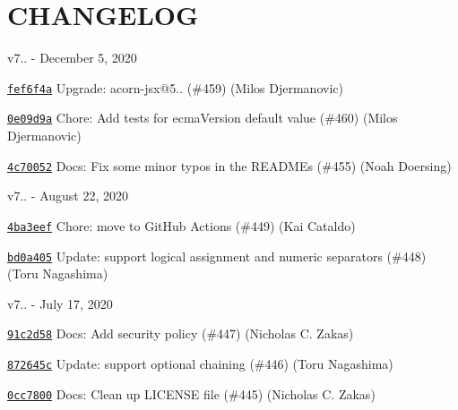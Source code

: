 \chapter{CHANGELOG}
\hypertarget{md__c_1_2_users_2_s_t_r_i_d_e_r_2source_2repos_2_internal_a_p_i_2_internal_a_p_i_2wwwroot_2lib_28a021f10c375091f8540f22b93ae7483}{}\label{md__c_1_2_users_2_s_t_r_i_d_e_r_2source_2repos_2_internal_a_p_i_2_internal_a_p_i_2wwwroot_2lib_28a021f10c375091f8540f22b93ae7483}
v7.. -\/ December 5, 2020


\begin{DoxyItemize}
\item \href{https://github.com/eslint/espree/commit/fef6f4a2803d959304c6961527044bd9da39ac92}{\texttt{ {\ttfamily fef6f4a}}} Upgrade\+: acorn-\/jsx@5.. (\#459) (Milos Djermanovic)
\item \href{https://github.com/eslint/espree/commit/0e09d9a4f213cb87073a6a87cb7d6317b77d1a23}{\texttt{ {\ttfamily 0e09d9a}}} Chore\+: Add tests for ecma\+Version default value (\#460) (Milos Djermanovic)
\item \href{https://github.com/eslint/espree/commit/4c70052df0b0ba903602c1f838918cbc07ee5eca}{\texttt{ {\ttfamily 4c70052}}} Docs\+: Fix some minor typos in the READMEs (\#455) (Noah Doersing)
\end{DoxyItemize}

v7.. -\/ August 22, 2020


\begin{DoxyItemize}
\item \href{https://github.com/eslint/espree/commit/4ba3eefdc4b32784565822b34f11977e99ca1a19}{\texttt{ {\ttfamily 4ba3eef}}} Chore\+: move to Git\+Hub Actions (\#449) (Kai Cataldo)
\item \href{https://github.com/eslint/espree/commit/bd0a405ffbe4962bcf5aa225ed3861a6a15cb827}{\texttt{ {\ttfamily bd0a405}}} Update\+: support logical assignment and numeric separators (\#448) (Toru Nagashima)
\end{DoxyItemize}

v7.. -\/ July 17, 2020


\begin{DoxyItemize}
\item \href{https://github.com/eslint/espree/commit/91c2d5896889042058399cd64de4b218c5add0eb}{\texttt{ {\ttfamily 91c2d58}}} Docs\+: Add security policy (\#447) (Nicholas C. Zakas)
\item \href{https://github.com/eslint/espree/commit/872645cea0bee08960b93c097f84153d44b44d7f}{\texttt{ {\ttfamily 872645c}}} Update\+: support optional chaining (\#446) (Toru Nagashima)
\item \href{https://github.com/eslint/espree/commit/0cc78007c933564f32fd849bd8022992845c3ac1}{\texttt{ {\ttfamily 0cc7800}}} Docs\+: Clean up LICENSE file (\#445) (Nicholas C. Zakas)
\end{DoxyItemize}

